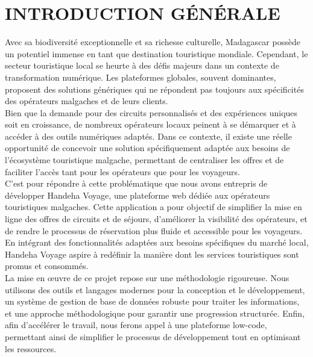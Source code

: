 \documentclass[12pt]{report}
\begin{document}
			\chapter*{INTRODUCTION GÉNÉRALE}
			\begin{center}
				\begin{minipage}{\textwidth}
					\hspace{15pt} Avec sa biodiversité exceptionnelle et sa richesse culturelle, Madagascar possède un potentiel immense en tant que destination touristique mondiale. Cependant, le secteur touristique local se heurte à des défis majeurs dans un contexte de transformation numérique. Les plateformes globales, souvent dominantes, proposent des solutions génériques qui ne répondent pas toujours aux spécificités des opérateurs malgaches et de leurs clients.\\
	
					\hspace{15pt}Bien que la demande pour des circuits personnalisés et des expériences uniques soit en croissance, de nombreux opérateurs locaux peinent à se démarquer et à accéder à des outils numériques adaptés. Dans ce contexte, il existe une réelle opportunité de concevoir une solution spécifiquement adaptée aux besoins de l’écosystème touristique malgache, permettant de centraliser les offres et de faciliter l’accès tant pour les opérateurs que pour les voyageurs.\\
	
					\hspace{15pt}C’est pour répondre à cette problématique que nous avons entrepris de développer Handeha Voyage, une plateforme web dédiée aux opérateurs touristiques malgaches. Cette application a pour objectif de simplifier la mise en ligne des offres de circuits et de séjours, d’améliorer la visibilité des opérateurs, et de rendre le processus de réservation plus fluide et accessible pour les voyageurs. En intégrant des fonctionnalités adaptées aux besoins spécifiques du marché local, Handeha Voyage aspire à redéfinir la manière dont les services touristiques sont promus et consommés.\\
	
					\hspace{15pt}La mise en œuvre de ce projet repose sur une méthodologie rigoureuse. Nous utilisons des outils et langages modernes pour la conception et le développement, un système de gestion de base de données robuste pour traiter les informations, et une approche méthodologique pour garantir une progression structurée. Enfin, afin d'accélérer le travail, nous ferons appel à une plateforme low-code, permettant ainsi de simplifier le processus de développement tout en optimisant les ressources.\\
	

\end{minipage}
\end{center}
\end{document}
